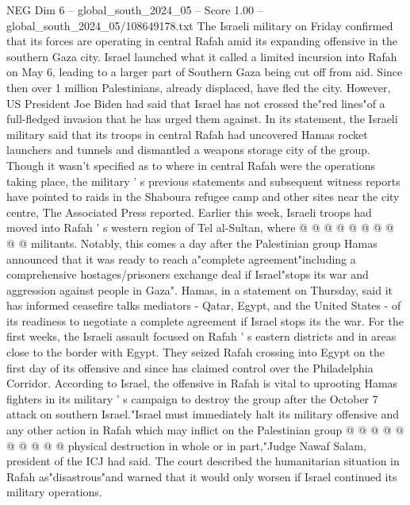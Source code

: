\begin{textsample}{NEG Dim 6 – global\_south\_2024\_05 – Score 1.00 – global\_south\_2024\_05/108649178.txt}  \label{ex:f6_neg_290}
The Israeli military on Friday confirmed that its forces are operating in central Rafah amid its expanding offensive in the southern Gaza city.
Israel launched what it called a limited incursion into Rafah on May 6, leading to a larger part of Southern Gaza being cut off from aid.
Since then over 1 million Palestinians, already displaced, have fled the city.
However, US President Joe Biden had said that Israel has not crossed the"red lines"of a full-fledged invasion that he has urged them against.
In its statement, the Israeli military said that its troops in central Rafah had uncovered Hamas rocket launchers and tunnels and dismantled a weapons storage city of the group.
Though it wasn't specified as to where in central Rafah were the operations taking place, the military ' s previous statements and subsequent witness reports have pointed to raids in the Shaboura refugee camp and other sites near the city centre, The Associated Press reported.
Earlier this week, Israeli troops had moved into Rafah ' s western region of Tel al-Sultan, where @ @ @ @ @ @ @ @ @ @ militants.
Notably, this comes a day after the Palestinian group Hamas announced that it was ready to reach a"complete agreement"including a comprehensive hostages/prisoners exchange deal if Israel"stops its war and aggression against people in Gaza".
Hamas, in a statement on Thursday, said it has informed ceasefire talks mediators - Qatar, Egypt, and the United States - of its readiness to negotiate a complete agreement if Israel stops its the war.
For the first weeks, the Israeli assault focused on Rafah ' s eastern districts and in areas close to the border with Egypt.
They seized Rafah crossing into Egypt on the first day of its offensive and since has claimed control over the Philadelphia Corridor.
According to Israel, the offensive in Rafah is vital to uprooting Hamas fighters in its military ' s campaign to destroy the group after the October 7 attack on southern Israel."Israel must immediately halt its military offensive and any other action in Rafah which may inflict on the Palestinian group @ @ @ @ @ @ @ @ @ @ physical destruction in whole or in part,"Judge Nawaf Salam, president of the ICJ had said.
The court described the humanitarian situation in Rafah as"disastrous"and warned that it would only worsen if Israel continued its military operations.

\end{textsample}
